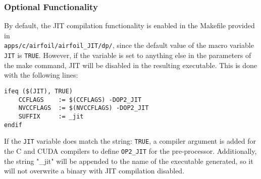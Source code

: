 \subsubsection{Optional Functionality}
By default, the JIT compilation functionality is enabled in the Makefile provided in \\\verb|apps/c/airfoil/airfoil_JIT/dp/|, since the default value of the macro variable \verb|JIT| is \verb|TRUE|. However, if the variable is set to anything else in the parameters of the make command, JIT will be disabled in the resulting executable. This is done with the following lines:
\begin{lstlisting}[linewidth = \textwidth, framesep=0pt]
ifeq ($(JIT), TRUE)
	CCFLAGS    := $(CCFLAGS) -DOP2_JIT
	NVCCFLAGS  := $(NVCCFLAGS) -DOP2_JIT
	SUFFIX     := _jit
endif
\end{lstlisting}
If the \verb|JIT| variable does match the string: \verb|TRUE|, a compiler argument is added for the C and CUDA compilers to define \verb|OP2_JIT| for the pre-processor. Additionally, the string "\_jit" will be appended to the name of the executable generated, so it will not overwrite a binary with JIT compilation disabled.

